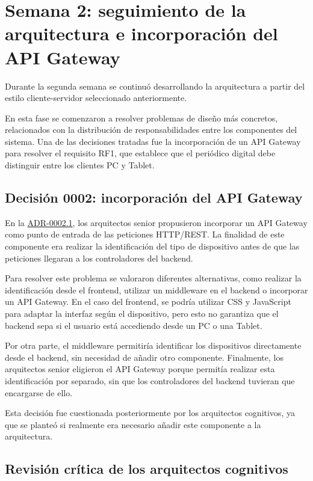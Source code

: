 \chapter{Semana 2: seguimiento de la arquitectura e incorporación del API Gateway}

Durante la segunda semana se continuó desarrollando la arquitectura a partir del estilo cliente-servidor seleccionado anteriormente.

En esta fase se comenzaron a resolver problemas de diseño más concretos, relacionados con la distribución de responsabilidades entre los componentes del sistema. Una de las decisiones tratadas fue la incorporación de un API Gateway para resolver el requisito RF1, que establece que el periódico digital debe distinguir entre los clientes PC y Tablet.

\section{Decisión 0002: incorporación del API Gateway}

En la \href{Decisiones/0002.1-api-gateway-discriminacion-clientes.md}{ADR-0002.1}, los arquitectos senior propusieron incorporar un API Gateway como punto de entrada de las peticiones HTTP/REST. La finalidad de este componente era realizar la identificación del tipo de dispositivo antes de que las peticiones llegaran a los controladores del backend.

Para resolver este problema se valoraron diferentes alternativas, como realizar la identificación desde el frontend, utilizar un middleware en el backend o incorporar un API Gateway. En el caso del frontend, se podría utilizar CSS y JavaScript para adaptar la interfaz según el dispositivo, pero esto no garantiza que el backend sepa si el usuario está accediendo desde un PC o una Tablet.

Por otra parte, el middleware permitiría identificar los dispositivos directamente desde el backend, sin necesidad de añadir otro componente. Finalmente, los arquitectos senior eligieron el API Gateway porque permitía realizar esta identificación por separado, sin que los controladores del backend tuvieran que encargarse de ello.

Esta decisión fue cuestionada posteriormente por los arquitectos cognitivos, ya que se planteó si realmente era necesario añadir este componente a la arquitectura.

\section{Revisión crítica de los arquitectos cognitivos}

